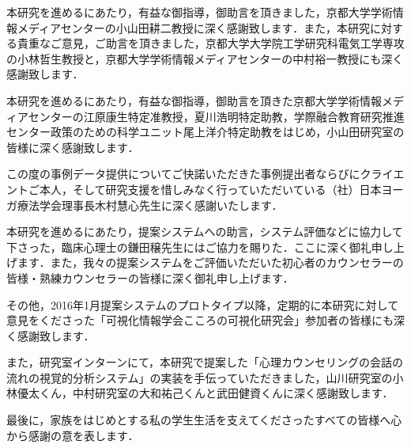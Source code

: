 \documentclass[shuuron]{kuee}
\begin{document}
\begin{acknowledgements}

  本研究を進めるにあたり，有益な御指導，御助言を頂きました，京都大学学術情報メディアセンターの小山田耕二教授に深く感謝致します．また，本研究に対する貴重なご意見，ご助言を頂きました，京都大学大学院工学研究科電気工学専攻の小林哲生教授と，京都大学学術情報メディアセンターの中村裕一教授にも深く感謝致します．

  本研究を進めるにあたり，有益な御指導，御助言を頂きた京都大学学術情報メディアセンターの江原康生特定准教授，夏川浩明特定助教，学際融合教育研究推進センター政策のための科学ユニット尾上洋介特定助教をはじめ，小山田研究室の皆様に深く感謝致します．

  この度の事例データ提供についてご快諾いただきた事例提出者ならびにクライエントご本人，そして研究支援を惜しみなく行っていただいている（社）日本ヨーガ療法学会理事長木村慧心先生に深く感謝いたします．

  本研究を進めるにあたり，提案システムへの助言，システム評価などに協力して下さった，臨床心理士の鎌田穣先生にはご協力を賜りた．ここに深く御礼申し上げます．また，我々の提案システムをご評価いただいた初心者のカウンセラーの皆様・熟練カウンセラーの皆様に深く御礼申し上げます．

  その他，2016年1月提案システムのプロトタイプ以降，定期的に本研究に対して意見をくださった「可視化情報学会こころの可視化研究会」参加者の皆様にも深く感謝致します．

  また，研究室インターンにて，本研究で提案した「心理カウンセリングの会話の流れの視覚的分析システム」の実装を手伝っていただきました，山川研究室の小林優太くん，中村研究室の大和祐己くんと武田健資くんに深く感謝致します．





  最後に，家族をはじめとする私の学生生活を支えてくださったすべての皆様へ心から感謝の意を表します．
\end{acknowledgements}



\end{document}
